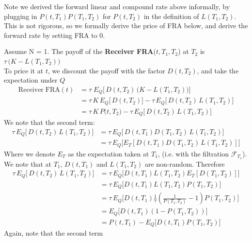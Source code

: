     Note we derived the forward linear and compound rate above informally,
    by plugging in $P(t, T_1) P(T_1, T_2)$ for $P(t, T_2)$ in the definition of $L(T_1, T_2)$.\\
    This is not rigorous, so we formally derive the price of FRA below,
    and derive the forward rate by setting FRA to 0.
    \begin{definition}
        Assume N = 1. The payoff of the \textbf{Receiver FRA}($t, T_1, T_2$) at \(T_2\)
        is $\tau \, \bigl(K - L(T_1, T_2)\bigr) $\\
        To price it at $t$, we discount the payoff with the factor \(D(t, T_2)\), 
        and take the expectation under \(Q\)
    \begin{align*}
        \mathrm{Receiver\;FRA}(t) 
          &= \tau\; E_Q\bigl[\,D(t, T_2)\,\bigl(K - L(T_1, T_2)\bigr)\bigr]\\
          &= \tau\,K\,E_Q\bigl[\,D(t, T_2)\bigr] - \tau\,E_Q\bigl[\,D(t, T_2)\,L(T_1, T_2)\bigr]\\
          &= \tau\,K\,P\bigl(t, T_2\bigr) - \tau\,E_Q\bigl[\,D(t, T_2)\,L(T_1, T_2)\bigr]
    \end{align*}
    We note that the second term:
    \begin{align*}
        \tau\, E_Q\bigl[\,D(t, T_2)\,L(T_1, T_2)\bigr]
        &= \tau\, E_Q\bigl[\,D(t, T_1) D(T_1, T_2)\,L(T_1, T_2)\bigr]\\
        &= \tau\, E_Q\bigl[ E_T[ D(t, T_1) D(T_1, T_2)\,L(T_1, T_2) ]\bigr]
    \end{align*}
    Where we denote $E_T$ as the expectation taken at $T_1$, 
    (i.e. with the filtration $\mathcal{F}_{T_1}$).\\
    We note that at $T_1$, $D(t, T_1)$ and $L(T_1, T_2)$ are non-random.
    Therefore
    \begin{align*}
        \tau\, E_Q\bigl[\,D(t, T_2)\,L(T_1, T_2)\bigr]
        &= \tau\, E_Q\bigl[ D(t, T_1) L(T_1, T_2) E_T[ D(T_1, T_2) ]\bigr]\\
        &= \tau\, E_Q\bigl[ D(t, T_1) L(T_1, T_2) P(T_1, T_2)\bigr]\\
        &= \tau\, E_Q\bigl[ D(t, T_1) \frac{1}{\tau} 
        \left( \frac{1}{P(T_1, T_2)} - 1 \right) P(T_1, T_2)\bigr]\\
        &= E_Q \bigl[ D(t, T_1) \left( 1 - P(T_1, T_2) \right) \bigr]\\
        &= P(t, T_1) - E_Q \bigl[ D(t, T_1) P(T_1, T_2) \bigr]
    \end{align*}
    Again, note that the second term

\end{definition}
